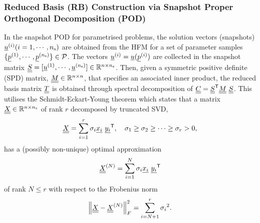 \subsubsection{Reduced Basis (RB) Construction via Snapshot Proper Orthogonal Decomposition (POD)}
In the snapshot POD for parametrised problems, the solution vectors (snapshots) $\underline{u}^{(i)}(i=1,\cdots,{n_{\rm s}})$ are obtained from the HFM for a set of parameter samples $\{\underline{p}^{(1)},\cdots,\underline{p}^{({n_{\rm s}})}\} \in {\cal P}$. The vectors ${\underline{u}^{(i)} = \underline{u}(\underline{p}^{(i)})}$ are collected in the snapshot matrix $\underline{\underline{S}}=[\underline{u}^{(1)},\cdots,\underline{u}^{({n_{\rm s}})}] \in {\mathbb{ R}}^{n \times {n_{\rm s}} }$. Then, given a symmetric positive definite (SPD) matrix, $\underline{\underline{M}} \in {\mathbb{ R}}^{n \times n}$, that specifies an associated inner product, the reduced basis matrix $\underline{\underline{T}}$ is obtained through spectral decomposition of $\underline{\underline{C}} = {\underline{\underline{S}}}^{\sf T} \underline{\underline{M}} \ \underline{\underline{S}}$. This utilises the {Schmidt-Eckart-Young theorem} which states that a matrix $\underline{\underline{X}} \in {\mathbb{ R}}^{n \times {n_{\rm s}}}$ of rank $r$ decomposed by truncated SVD,
\begin{equation}
	\mat{X}=\sum_{i=1}^{r} \sigma_i \vek{x_i} \ \T{\vek{y_i}}, \quad \sigma_1 \geq \sigma_2 \geq \cdots \geq \sigma_r > 0,
\end{equation}
has a (possibly non-unique) optimal approximation
\begin{equation}
	\mat{X}^{(N)}=\sum_{i=1}^{N} \sigma_i \vek{x_i} \ \T{\vek{y_i}}
\end{equation}
of rank $N \leq r$ with respect to the Frobenius norm
\begin{equation}
	\left\lVert  \underline{\underline{X}} - \underline{\underline{X}}^{(N)} \right\rVert_{F}^{2}=\sum_{i=N+1}^{r} {\sigma_i}^2.
\end{equation}

